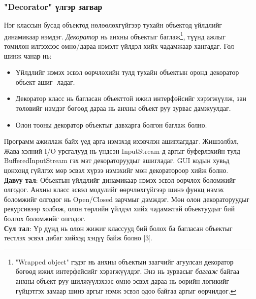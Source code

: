 \subsubsection{"Decorator" үлгэр загвар}
\quad \quad Нэг классын бусад объектод нөлөөлөхгүйгээр тухайн объектод үйлдлийг динамикаар нэмдэг. \textit{Декоратор} нь анхны объектыг баглаж\footnote{"Wrapped object" гэдэг нь анхны объектын заагчийг агуулсан декоратор бөгөөд ижил интерфейсийг хэрэгжүүлдэг. Энэ нь зурвасыг \textit{баглаж} байгаа анхны объект руу шилжүүлэхээс өмнө эсвэл дараа нь өөрийн логикийг гүйцэтгэх замаар шинэ аргыг нэмж эсвэл одоо байгаа аргыг өөрчилдөг.}, түүнд ажлыг томилон илгээхээс өмнө/дараа нэмэлт үйлдэл хийх чадамжаар хангадаг. Гол шинж чанар нь:
\begin{itemize}
	\item Үйлдлийг нэмэх эсвэл өөрчлөхийн тулд тухайн объектын оронд декоратор объект ашиг- ладаг. 
	\item Декоратор класс нь багласан объекттой ижил интерфэйсийг хэрэгжүүлж, зан төлөвийг нэмдэг бөгөөд дараа нь анхны объект руу зурвас дамжуулдаг.
	\item Олон тооны декоратор объектыг давхарга болгон баглаж болно.
\end{itemize}
Программ ажиллаж байх үед арга нэмэхэд ихэвчлэн ашиглагддаг. Жишээлбэл, Жава хэлний I/O урсгалууд нь үндсэн InputStream-д аргыг буферлэхийн тулд BufferedInputStream гэх мэт декораторуудыг ашигладаг. GUI кодын хувьд цонхонд гүйлгэх мөр эсвэл хүрээ нэмэхийг мөн декоратороор хийж болно.\\
\textbf{Давуу тал}: Объектын үйлдлийг динамикаар нэмэх эсвэл өөрчлөх боломжийг олгодог. Анхны класс эсвэл модулийг өөрчлөхгүйгээр шинэ функц нэмэх боломжийг олгодог нь Open/Closed зарчмыг дэмждэг. Мөн олон декораторуудыг рекурсивээр холбож, олон төрлийн үйлдэл хийх чадамжтай объектуудыг бий болгох боломжийг олгодог.\\
\textbf{Сул тал}: Үр дүнд нь олон жижиг классууд бий болох ба багласан объектыг тестлэх эсвэл дибаг хийхэд хэцүү байж болно [3].
